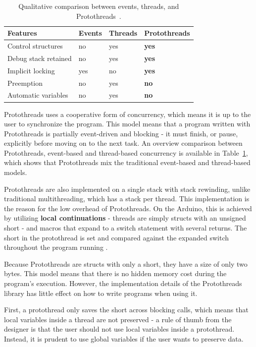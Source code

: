 \begin{table}[htb!]
  \centering
  \begin{tabular}{lll>{\bfseries}l}
    \toprule
    Features             & Events & Threads & Protothreads \\ \midrule
    Control structures   & no     & yes     & yes          \\
    Debug stack retained & no     & yes     & yes          \\
    Implicit locking     & yes    & no      & yes          \\
    Preemption           & no     & yes     & no           \\
    Automatic variables  & no     & yes     & no
  \end{tabular}
  \caption{Qualitative comparison between events, threads, and Protothreads~\cite{dunkels05using}.}
  \label{tab:protothreadscomparison}
\end{table}


Protothreads uses a cooperative form of concurrency, which means it is up to the user to synchronize the program. This model means that a program written with Protothreads is partially event-driven and blocking - it must finish, or pause, explicitly before moving on to the next task. An overview comparison between Protothreads, event-based and thread-based concurrency is available in Table~\ref{tab:protothreadscomparison}, which shows that Protothreads mix the traditional event-based and thread-based models.

Protothreads are also implemented on a single stack with stack rewinding, unlike traditional multithreading, which has a stack per thread. This implementation is the reason for the low overhead of Protothreads. On the Arduino, this is achieved by utilizing \textbf{local continuations} - threads are simply structs with an unsigned short - and macros that expand to a switch statement with several returns. The short in the protothread is set and compared against the expanded switch throughout the program running \cite{AdamDunkelProtothreads}.




Because Protothreads are structs with only a short, they have a size of only two bytes. This model means that there is no hidden memory cost during the program's execution. However, the implementation details of the Protothreads library has little effect on how to write programs when using it.

First, a protothread only saves the short across blocking calls, which means that local variables inside a thread are not preserved - a rule of thumb from the designer is that the user should not use local variables inside a protothread. Instead, it is prudent to use global variables if the user wants to preserve data.


